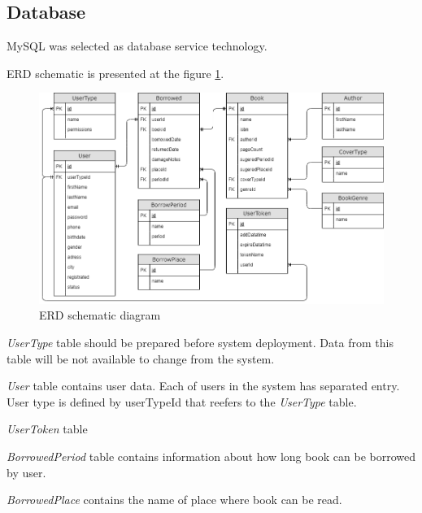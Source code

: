 \subsection{Database}
MySQL was selected as database service technology.

ERD schematic is presented at the figure \ref{fig:database_erd_schematic}.
\begin{figure}[h]
    \centering
    \includegraphics[width=\textwidth]{Include/Resources/Database/Project/databse_ERD_diagram.png}
    \caption{ERD schematic diagram}
    \label{fig:database_erd_schematic}
\end{figure}

\textit{UserType} table should be prepared before system deployment. Data from this table will be not available to change from the system.

\textit{User} table contains user data. Each of users in the system has separated entry. User type  is defined by userTypeId that reefers to the \textit{UserType} table.

\textit{UserToken} table 

\textit{BorrowedPeriod}  table contains information about how long book can be borrowed by user.

\textit{BorrowedPlace} contains the name of place where book can be read.
